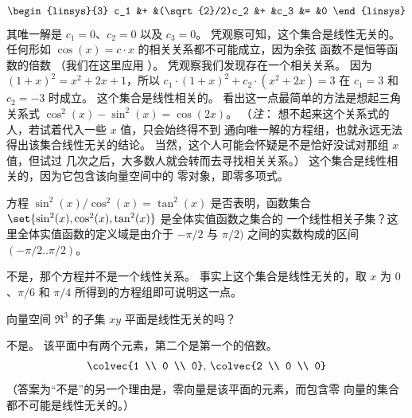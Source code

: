 \begin{exercises}
\begin{answer}
\begin{exparts}
\begin{equation*}
\begin{linsys}{3}
               c_1  &+  &(\sqrt{2}/2)c_2 &+  &c_3   &=  &0
            \end{linsys}
          \end{equation*}
          其唯一解是
          $c_1=0$、$c_2=0$ 以及 $c_3=0$。
        \partsitem 凭观察可知，这个集合是线性无关的。
          任何形如 $\cos(x)=c\cdot x$ 的相关关系都不可能成立，因为余弦
          函数不是恒等函数的倍数
          （我们在这里应用 ）。
        \partsitem 凭观察我们发现存在一个相关关系。
          因为 $(1+x)^2=x^2+2x+1$，所以
          $c_1\cdot(1+x)^2+c_2\cdot(x^2+2x)=3$ 在
          $c_1=3$ 和 $c_2=-3$ 时成立。
        \partsitem 这个集合是线性相关的。
          看出这一点最简单的方法是想起三角关系式
          $\cos^2(x)-\sin^2(x)=\cos(2x)$。
          （\textit{注}：
          想不起来这个关系式的人，若试着代入一些 $x$ 值，只会始终得不到
          通向唯一解的方程组，也就永远无法得出该集合线性无关的结论。
          当然，这个人可能会怀疑是不是恰好没试对那组 $x$ 值，但试过
          几次之后，大多数人就会转而去寻找相关关系。）
        \partsitem 这个集合是线性相关的，因为它包含该向量空间中的
          零对象，即零多项式。
      \end{exparts}
     \end{answer}
  \item
    方程 \( \sin^2(x)/\cos^2(x)=\tan^2(x) \) 是否表明，函数集合
    \( \set{\sin^2(x),\cos^2(x),\tan^2(x)} \) 是全体实值函数之集合的
    一个线性相关子集？这里全体实值函数的定义域是由介于
    \( -\pi/2 \) 与 \( \pi/2) \) 之间的实数构成的区间
    \( (-\pi/2..\pi/2) \)。
    \begin{answer}
      不是，那个方程并不是一个线性关系。
      事实上这个集合是线性无关的，取 \( x \) 为 \( 0 \)、\( \pi/6 \)
      和 \( \pi/4 \) 所得到的方程组即可说明这一点。
    \end{answer}
  \item
    向量空间 $\Re^3$ 的子集 $xy$ 平面是线性无关的吗？
    \begin{answer}
      不是。
      该平面中有两个元素，第二个是第一个的倍数。
      \begin{equation*}
        \colvec{1  \\ 0 \\ 0},\,\colvec{2 \\ 0 \\ 0}
      \end{equation*}
      （答案为“不是”的另一个理由是，零向量是该平面的元素，而包含零
      向量的集合都不可能是线性无关的。）
    \end{answer}

\end{exercises}

